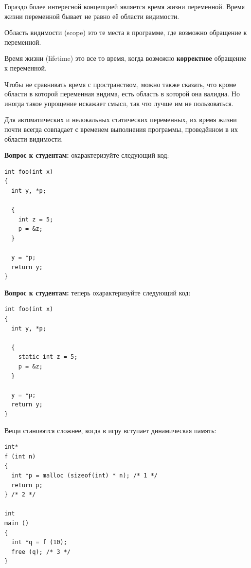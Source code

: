 \documentclass[a4paper,12pt,oneside]{article}
\newif\ifanswers
\begin{document}
Гораздо более интересной концепцией является время жизни переменной. Время жизни переменной бывает не равно её области видимости.

Область видимости (scope) это те места в программе, где возможно обращение к переменной.

Время жизни (lifetime) это все то время, когда возможно \textbf{корректное} обращение к переменной.

Чтобы не сравнивать время с пространством, можно также сказать, что кроме области в которой переменная видима, есть область в которой она валидна. Но иногда такое упрощение искажает смысл, так что лучше им не пользоваться.

Для автоматических и нелокальных статических переменных, их время жизни почти всегда совпадает с временем выполнения программы, проведённом в их области видимости.

\textbf{Вопрос к студентам:} охарактеризуйте следующий код:

\begin{lstlisting}
int foo(int x) 
{
  int y, *p;

  {
    int z = 5; 
    p = &z;
  }

  y = *p;
  return y;
}
\end{lstlisting}

\ifanswers
Правильный ответ: этот код демонстрирует undefined behavior. В точке разыменования указателя истекло время жизни того, на что он указывает.
\fi

\textbf{Вопрос к студентам:} теперь охарактеризуйте следующий код:

\begin{lstlisting}
int foo(int x) 
{
  int y, *p;

  {
    static int z = 5; 
    p = &z;
  }

  y = *p;
  return y;
}
\end{lstlisting}

\ifanswers
Правильный ответ: здесь работает ещё одна перегруженная функция ключевого слова \lstinline!static! -- оно расширяет время жизни переменной до времени жизни программы. Таким образом здесь будет все хорошо -- переменная \lstinline!z! будет жить даже между вызовами функции.
\fi

Вещи становятся сложнее, когда в игру вступает динамическая память:

\begin{lstlisting}
int* 
f (int n) 
{
  int *p = malloc (sizeof(int) * n); /* 1 */
  return p;
} /* 2 */

int 
main () 
{
  int *q = f (10); 
  free (q); /* 3 */
}
\end{lstlisting}
\end{document}
